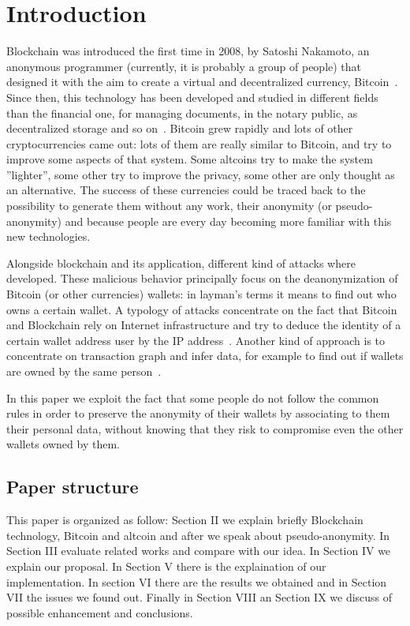 \section{Introduction}
Blockchain was introduced the first time in 2008, by Satoshi Nakamoto, an
anonymous programmer (currently, it is probably a group of people) that
designed it with the aim to create a virtual and decentralized currency,
Bitcoin~\cite{satoshi}. Since then, this technology has been developed and
studied in different fields than the financial one, for managing documents, in
the notary public, as decentralized storage and so on~\cite{air}. Bitcoin grew
rapidly and lots of other cryptocurrencies came out: lots of them are really
similar to Bitcoin, and try to improve some aspects of that system. Some
altcoins try to make the system ''lighter'', some other try to improve the
privacy, some other are only thought as an alternative. The success of these
currencies could be traced back to the possibility to generate them without any 
work,
their anonymity (or pseudo-anonymity) and because people are every day becoming
more familiar with this new technologies.

Alongside blockchain and its application, different kind of attacks where
developed. These malicious behavior principally focus on the deanonymization of
Bitcoin (or other currencies) wallets: in layman's terms it means to find out
who owns a certain wallet. A typology of attacks concentrate on the fact that
Bitcoin and Blockchain rely on Internet infrastructure and try to deduce the
identity of a certain wallet address user by the IP address~\cite{deanon}.
Another kind of approach is to concentrate on transaction graph and infer data,
for example to find out if wallets are owned by the same person~\cite{fistful}.

In this paper we exploit the fact that some people do not follow the common
rules in order to preserve the anonymity of their wallets by associating to them
their personal data, without knowing that they risk to compromise even the other
wallets owned by them.


\subsection{Paper structure}
This paper is organized as follow: Section II we explain briefly Blockchain
technology, Bitcoin and altcoin and after we speak about pseudo-anonymity. In
Section III evaluate related works and compare with our idea. In Section IV we
explain our proposal. In Section V there is the explaination of our
implementation. In section VI there are the results we obtained and in Section
VII the issues we found out. Finally in Section VIII an Section IX we discuss
of possible enhancement and conclusions.
